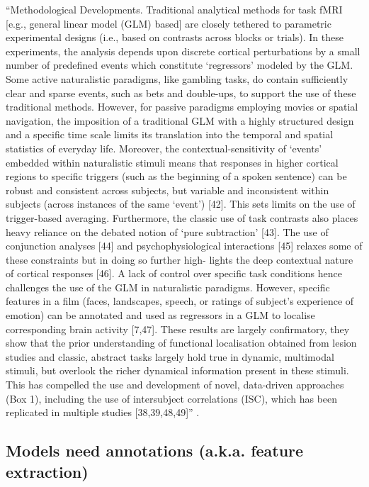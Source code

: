 %
``Methodological Developments.
%
Traditional analytical methods for task fMRI [e.g., general linear model (GLM)
based] are closely tethered to parametric experimental designs (i.e., based on
contrasts across blocks or trials).
%
In these experiments, the analysis depends upon discrete cortical perturbations
by a small number of predefined events which constitute ‘regressors’ modeled by
the GLM.
%
Some active naturalistic paradigms, like gambling tasks, do contain sufficiently
clear and sparse events, such as bets and double-ups, to support the use of
these traditional methods.
%
However, for passive paradigms employing movies or spatial navigation, the
imposition of a traditional GLM with a highly structured design and a specific
time scale limits its translation into the temporal and spatial statistics of
everyday life.
%
Moreover, the contextual-sensitivity of ‘events’ embedded within naturalistic
stimuli means that responses in higher cortical regions to specific triggers
(such as the beginning of a spoken sentence) can be robust and consistent across
subjects, but variable and inconsistent within subjects (across instances of the
same ‘event’) [42].
%
This sets limits on the use of trigger-based averaging.
%
Furthermore, the classic use of task contrasts also places heavy reliance on the
debated notion of ‘pure subtraction’ [43].
%
The use of conjunction analyses [44] and psychophysiological interactions [45]
relaxes some of these constraints but in doing so further high- lights the deep
contextual nature of cortical responses [46].
%
A lack of control over specific task conditions hence challenges the use of the
GLM in naturalistic paradigms.
%
However, specific features in a film (faces, landscapes, speech, or ratings of
subject’s experience of emotion) can be annotated and used as regressors in a
GLM to localise corresponding brain activity [7,47].
%
These results are largely confirmatory, they show that the prior understanding
of functional localisation obtained from lesion studies and classic, abstract
tasks largely hold true in dynamic, multimodal stimuli, but overlook the richer
dynamical information present in these stimuli.
%
This has compelled the use and development of novel, data-driven approaches (Box
1), including the use of intersubject correlations (ISC), which has been
replicated in multiple studies [38,39,48,49]''
\citep{sonkusare2019naturalistic}.



\subsection{Models need annotations (a.k.a. feature extraction)}


